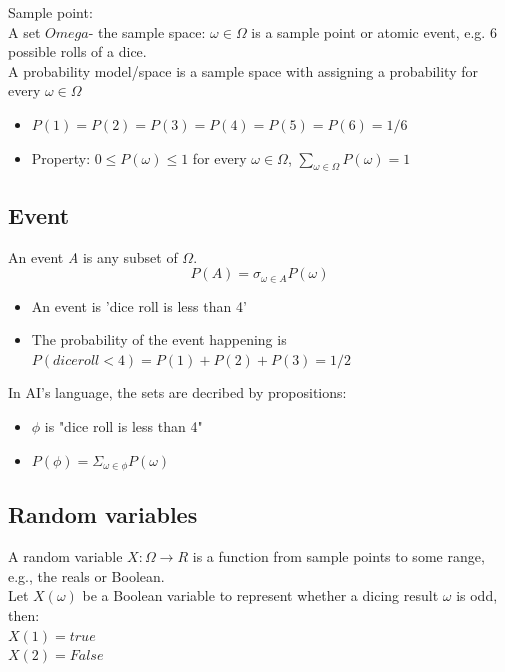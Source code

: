 Sample point:\\
A set $Omega $- the sample space: $\omega \in \Omega$ is a sample point or atomic event, e.g. 6 possible rolls of a dice.\\
A probability model/space is a sample space with assigning a probability for every $\omega \in \Omega$ 

\begin{itemize}
\item $P(1) = P(2) = P(3) = P(4) = P(5) = P(6) = 1/6$
\item Property: $0 \leq P(\omega) \leq 1 $ for every $\omega \in \Omega$, $\sum_{\omega \in \Omega} P(\omega) = 1$
\end{itemize}

\subsection{Event}
An event \textit{A} is any subset of $\Omega$.\\

\begin{equation}
P(A) = \sigma_{\omega \in A}P(\omega)
\end{equation}

\begin{itemize}
\item An event is 'dice roll is less than 4'
\item The probability of the event happening is $P(dice roll < 4)=P(1)+P(2)+P(3)=1/2$
\end{itemize}

In AI's language, the sets are decribed by propositions:
\begin{itemize}
\item $\phi$ is "dice roll is less than 4" 
\item $P(\phi) = \Sigma_{\omega \in \phi} P(\omega)$
\end{itemize}

\subsection{Random variables}
A random variable $X:\Omega \rightarrow R$ is a function from sample points to some range, e.g., the reals or Boolean.\\
Let $X(\omega)$ be a Boolean variable to represent whether a dicing result $\omega$ is odd, then:\\  

$X(1) = true$\\
$X(2) = False$\\

